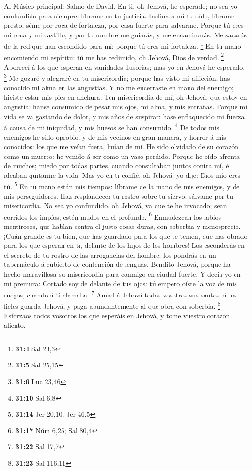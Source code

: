  Al Músico principal: Salmo de David. En ti, oh Jehová, he
esperado; no sea yo confundido para siempre: líbrame en tu justicia.
 Inclina á mí tu oído, líbrame presto; séme por roca de
fortaleza, por casa fuerte para salvarme.  Porque tú eres mi
roca y mi castillo; y por tu nombre me guiarás, y me encaminarás.
 Me sacarás de la red que han escondido para mí; porque tú
eres mi fortaleza. \footnote{\textbf{31:4} Sal 23,3}  En tu
mano encomiendo mi espíritu: tú me has redimido, oh Jehová, Dios de
verdad. \footnote{\textbf{31:5} Sal 25,15}  Aborrecí á los
que esperan en vanidades ilusorias; mas yo en Jehová he esperado.
\footnote{\textbf{31:6} Luc 23,46}  Me gozaré y alegraré en
tu misericordia; porque has visto mi aflicción; has conocido mi alma en
las angustias.  Y no me encerraste en mano del enemigo;
hiciste estar mis pies en anchura.  Ten misericordia de mí,
oh Jehová, que estoy en angustia: hanse consumido de pesar mis ojos, mi
alma, y mis entrañas.  Porque mi vida se va gastando de
dolor, y mis años de suspirar: hase enflaquecido mi fuerza á causa de mi
iniquidad, y mis huesos se han consumido. \footnote{\textbf{31:10} Sal
  6,8}  De todos mis enemigos he sido oprobio, y de mis
vecinos en gran manera, y horror á mis conocidos: los que me veían
fuera, huían de mí.  He sido olvidado de su corazón como un
muerto: he venido á ser como un vaso perdido.  Porque he
oído afrenta de muchos; miedo por todas partes, cuando consultaban
juntos contra mí, é ideaban quitarme la vida.  Mas yo en ti
confié, oh Jehová: yo dije: Dios mío eres tú. \footnote{\textbf{31:14}
  Jer 20,10; Jer 46,5}  En tu mano están mis tiempos:
líbrame de la mano de mis enemigos, y de mis perseguidores.
 Haz resplandecer tu rostro sobre tu siervo: sálvame por tu
misericordia.  No sea yo confundido, oh Jehová, ya que te
he invocado; sean corridos los impíos, estén mudos en el profundo.
\footnote{\textbf{31:17} Núm 6,25; Sal 80,4}  Enmudezcan
los labios mentirosos, que hablan contra el justo cosas duras, con
soberbia y menosprecio.  ¡Cuán grande es tu bien, que has
guardado para los que te temen, que has obrado para los que esperan en
ti, delante de los hijos de los hombres!  Los esconderás en
el secreto de tu rostro de las arrogancias del hombre: los pondrás en un
tabernáculo á cubierto de contención de lenguas.  Bendito
Jehová, porque ha hecho maravillosa su misericordia para conmigo en
ciudad fuerte.  Y decía yo en mi premura: Cortado soy de
delante de tus ojos: tú empero oíste la voz de mis ruegos, cuando á ti
clamaba. \footnote{\textbf{31:22} Sal 17,7}  Amad á Jehová
todos vosotros sus santos: á los fieles guarda Jehová, y paga
abundantemente al que obra con soberbia. \footnote{\textbf{31:23} Sal
  116,11}  Esforzaos todos vosotros los que esperáis en
Jehová, y tome vuestro corazón aliento.

